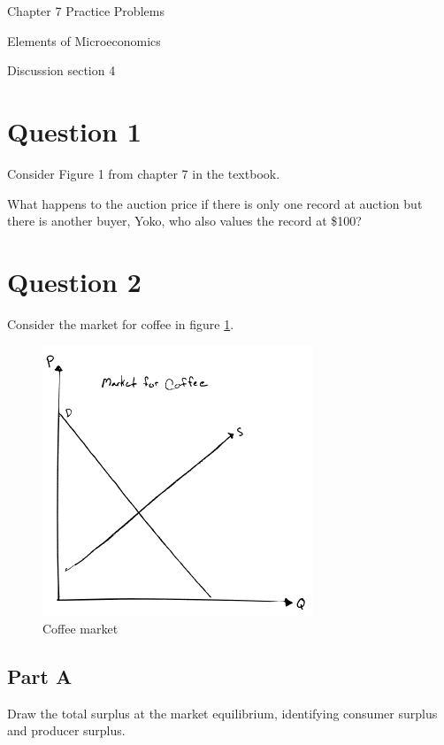 \documentclass[12pt]{article}
\begin{document}
\begin{center}
\Large Chapter 7 Practice Problems

\medskip

\normalsize Elements of Microeconomics

\medskip

\small Discussion section 4
\end{center}

\medskip

\section*{Question 1}
Consider Figure 1 from chapter 7 in the textbook.

\vspace{2mm}

What happens to the auction price if there is only one record at auction but there is another buyer, Yoko, who also values the record at \$100?

\vspace{2mm}

\section*{Question 2}
Consider the market for coffee in figure \ref{fig:coffee1}.

\begin{figure}
    \centering
    \includegraphics[width=.5\textwidth]{../figs/coffee1.png}
    \caption{Coffee market}
    \label{fig:coffee1}
\end{figure}

\subsection*{Part A}
Draw the total surplus at the market equilibrium, identifying consumer surplus and producer surplus.
\end{document}
